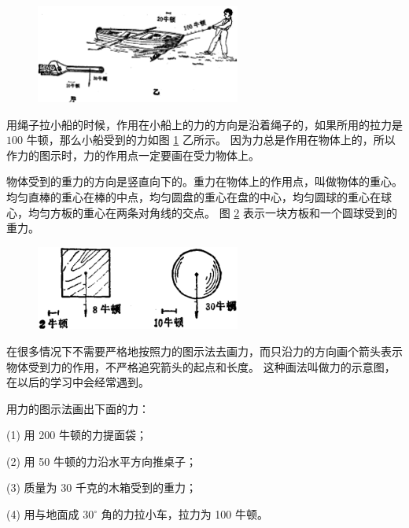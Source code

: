 \begin{figure}[htbp]
    \centering
    \includegraphics[width=0.6\textwidth]{../pic/czwl1-ch2-14}
    \caption{}\label{fig:2-14}
\end{figure}

用绳子拉小船的时候，作用在小船上的力的方向是沿着绳子的，如果所用的拉力是 $100$ 牛顿，那么小船受到的力如图 \ref{fig:2-14} 乙所示。
因为力总是作用在物体上的，所以作力的图示时，力的作用点一定要画在受力物体上。

物体受到的重力的方向是竖直向下的。重力在物体上的作用点，叫做物体的重心。
均匀直棒的重心在棒的中点，均匀圆盘的重心在盘的中心，均匀圆球的重心在球心，均匀方板的重心在两条对角线的交点。
图 \ref{fig:2-15} 表示一块方板和一个圆球受到的重力。

\begin{figure}[htbp]
    \centering
    \includegraphics[width=0.6\textwidth]{../pic/czwl1-ch2-15}
    \caption{}\label{fig:2-15}
\end{figure}

在很多情况下不需要严格地按照力的图示法去画力，而只沿力的方向画个箭头表示物体受到力的作用，不严格追究箭头的起点和长度。
这种画法叫做力的示意图，在以后的学习中会经常遇到。


\lianxi

用力的图示法画出下面的力：

(1) 用 200 牛顿的力提面袋；

(2) 用 50 牛顿的力沿水平方向推桌子；

(3) 质量为 30 千克的木箱受到的重力；

(4) 用与地面成 $30^\circ$ 角的力拉小车，拉力为 100 牛顿。


